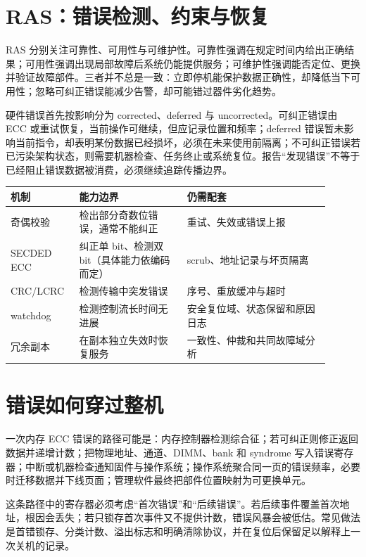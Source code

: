 \section{RAS：错误检测、约束与恢复}

RAS 分别关注可靠性、可用性与可维护性。可靠性强调在规定时间内给出正确结果；可用性强调出现局部故障后系统仍能提供服务；可维护性强调能否定位、更换并验证故障部件。三者并不总是一致：立即停机能保护数据正确性，却降低当下可用性；忽略可纠正错误能减少告警，却可能错过器件劣化趋势。

硬件错误首先按影响分为 corrected、deferred 与 uncorrected。可纠正错误由 ECC 或重试恢复，当前操作可继续，但应记录位置和频率；deferred 错误暂未影响当前指令，却表明某份数据已经损坏，必须在未来使用前隔离；不可纠正错误若已污染架构状态，则需要机器检查、任务终止或系统复位。报告“发现错误”不等于已经阻止错误数据被消费，必须继续追踪传播边界。

\begin{longtable}{L{0.18\linewidth}L{0.31\linewidth}L{0.41\linewidth}}
\toprule
机制 & 能力边界 & 仍需配套 \\
\midrule
奇偶校验 & 检出部分奇数位错误，通常不能纠正 & 重试、失效或错误上报 \\
SECDED ECC & 纠正单 bit、检测双 bit（具体能力依编码而定） & scrub、地址记录与坏页隔离 \\
CRC/LCRC & 检测传输中突发错误 & 序号、重放缓冲与超时 \\
watchdog & 检测控制流长时间无进展 & 安全复位域、状态保留和原因日志 \\
冗余副本 & 在副本独立失效时恢复服务 & 一致性、仲裁和共同故障域分析 \\
\bottomrule
\end{longtable}

\section{错误如何穿过整机}

一次内存 ECC 错误的路径可能是：内存控制器检测综合征；若可纠正则修正返回数据并递增计数；把物理地址、通道、DIMM、bank 和 syndrome 写入错误寄存器；中断或机器检查通知固件与操作系统；操作系统聚合同一页的错误频率，必要时迁移数据并下线页面；管理软件最终把部件位置映射为可更换单元。

这条路径中的寄存器必须考虑“首次错误”和“后续错误”。若后续事件覆盖首次地址，根因会丢失；若只锁存首次事件又不提供计数，错误风暴会被低估。常见做法是首错锁存、分类计数、溢出标志和明确清除协议，并在复位后保留足以解释上一次关机的记录。

